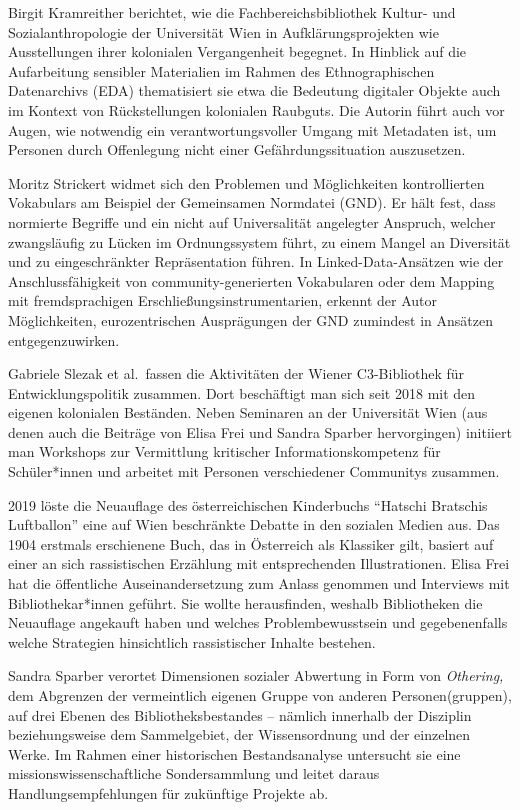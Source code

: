 \documentclass[a4paper,
fontsize=11pt,
oneside,
numbers=noperiodatend,
parskip=half-,
bibliography=totoc,
final
]{scrartcl}
\begin{document}
Birgit Kramreither berichtet, wie die Fachbereichsbibliothek Kultur- und
Sozialanthropologie der Universität Wien in Aufklärungsprojekten wie
Ausstellungen ihrer kolonialen Vergangenheit begegnet. In Hinblick auf
die Aufarbeitung sensibler Materialien im Rahmen des Ethnographischen
Datenarchivs (EDA) thematisiert sie etwa die Bedeutung digitaler Objekte
auch im Kontext von Rückstellungen kolonialen Raubguts. Die Autorin
führt auch vor Augen, wie notwendig ein verantwortungsvoller Umgang mit
Metadaten ist, um Personen durch Offenlegung nicht einer
Gefährdungssituation auszusetzen.

Moritz Strickert widmet sich den Problemen und Möglichkeiten
kontrollierten Vokabulars am Beispiel der Gemeinsamen Normdatei (GND).
Er hält fest, dass normierte Begriffe und ein nicht auf Universalität
angelegter Anspruch, welcher zwangsläufig zu Lücken im Ordnungssystem
führt, zu einem Mangel an Diversität und zu eingeschränkter
Repräsentation führen. In Linked-Data-Ansätzen wie der
Anschlussfähigkeit von community-generierten Vokabularen oder dem Mapping
mit fremdsprachigen Erschließungsinstrumentarien, erkennt der Autor
Möglichkeiten, eurozentrischen Ausprägungen der GND zumindest in
Ansätzen entgegenzuwirken.

Gabriele Slezak et al.~fassen die Aktivitäten der Wiener C3-Bibliothek
für Entwicklungspolitik zusammen. Dort beschäftigt man sich seit 2018
mit den eigenen kolonialen Beständen. Neben Seminaren an der Universität
Wien (aus denen auch die Beiträge von Elisa Frei und Sandra Sparber
hervorgingen) initiiert man Workshops zur Vermittlung kritischer
Informationskompetenz für Schüler*innen und arbeitet mit Personen
verschiedener Communitys zusammen.

2019 löste die Neuauflage des österreichischen Kinderbuchs
\enquote{Hatschi Bratschis Luftballon} eine auf Wien beschränkte Debatte
in den sozialen Medien aus. Das 1904 erstmals erschienene Buch, das in
Österreich als Klassiker gilt, basiert auf einer an sich rassistischen
Erzählung mit entsprechenden Illustrationen. Elisa Frei hat die
öffentliche Auseinandersetzung zum Anlass genommen und Interviews mit
Bibliothekar*innen geführt. Sie wollte herausfinden, weshalb
Bibliotheken die Neuauflage angekauft haben und welches
Problembewusstsein und gegebenenfalls welche Strategien hinsichtlich
rassistischer Inhalte bestehen.

Sandra Sparber verortet Dimensionen sozialer Abwertung in Form von
\emph{Othering,} dem Abgrenzen der vermeintlich eigenen Gruppe von
anderen Personen(gruppen), auf drei Ebenen des Bibliotheksbestandes --
nämlich innerhalb der Disziplin beziehungsweise dem Sammelgebiet, der
Wissensordnung und der einzelnen Werke. Im Rahmen einer historischen
Bestandsanalyse untersucht sie eine missionswissenschaftliche
Sondersammlung und leitet daraus Handlungsempfehlungen für zukünftige
Projekte ab.
\end{document}
